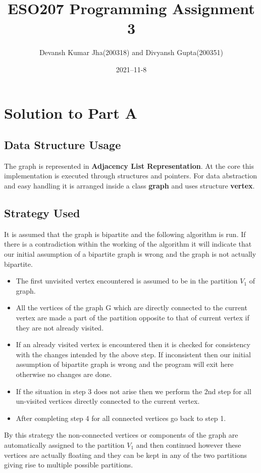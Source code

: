 \documentclass[20pt]{article}
\title{ESO207 Programming Assignment 3}
\author{Devansh Kumar Jha(200318) and Divyansh Gupta(200351)}
\date{2021–11-8}
\begin{document}
\maketitle

\section{Solution to Part A}
\subsection{Data Structure Usage}
The graph is represented in \textbf{Adjacency List Representation}. At the core this implementation is executed through structures and pointers. For data abstraction and easy handling it is arranged inside a class \textbf{graph} and uses structure \textbf{vertex}.

\subsection{Strategy Used}
It is assumed that the graph is bipartite and the following algorithm is run. If there is a contradiction within the working of the algorithm it will indicate that our initial assumption of a bipartite graph is wrong and the graph is not actually bipartite.

\begin{itemize}
\item The first unvisited vertex encountered is assumed to be in the partition $V_1$ of graph.
\item All the vertices of the graph G which are directly connected to the current vertex are made a part of the partition opposite to that of current vertex if they are not already visited.
\item If an already visited vertex is encountered then it is checked for consistency with the changes intended by the above step. If inconsistent then our initial assumption of bipartite graph is wrong and the program will exit here otherwise no changes are done.
\item If the situation in step 3 does not arise then we perform the 2nd step for all un-visited vertices directly connected to the current vertex.
\item After completing step 4 for all connected vertices go back to step 1.
\end{itemize}

By this strategy the non-connected vertices or components of the graph are automatically assigned to the partition $V_1$ and then continued however these vertices are actually floating and they can be kept in any of the two partitions giving rise to multiple possible partitions.
\end{document}
